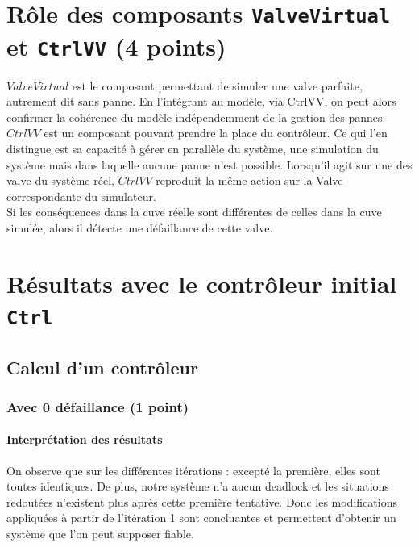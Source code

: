 \documentclass[a4paper]{book}
\begin{document}
\section{Rôle des composants {\tt ValveVirtual} et {\tt CtrlVV} (4 points)}

$ValveVirtual$ est le composant permettant de simuler une valve parfaite, autrement dit sans panne. En l'intégrant au modèle, via CtrlVV, on peut alors confirmer la cohérence du modèle indépendemment de la gestion des pannes. \\
$CtrlVV$ est un composant pouvant prendre la place du contrôleur. Ce qui l'en distingue est sa capacité à gérer en parallèle du système, une simulation du système mais dans laquelle aucune panne n'est possible. Lorsqu'il agit sur une des valve du système réel, $CtrlVV$ reproduit la même action sur la Valve correspondante du simulateur. \\
Si les conséquences dans la cuve réelle sont différentes de celles dans la cuve simulée, alors il détecte une défaillance de cette valve.

\section{Résultats avec le contrôleur initial {\tt Ctrl}}

\subsection{Calcul d'un contrôleur}

\subsubsection{Avec 0 défaillance (1 point)}





\paragraph{Interprétation des résultats}

On observe que sur les différentes itérations : excepté la première, elles sont toutes identiques. De plus, notre système n'a aucun deadlock et les situations redoutées n'existent plus après cette première tentative. Donc les modifications appliquées à partir de l'itération 1 sont concluantes et permettent d'obtenir un système que l'on peut supposer fiable.
\end{document}
